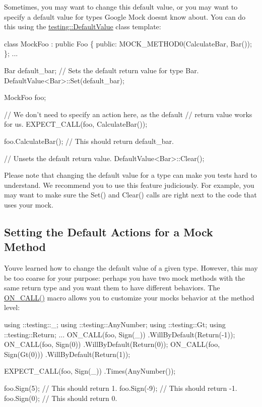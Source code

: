 Sometimes, you may want to change this default value, or you may want to specify a default value for types Google Mock doesn\textquotesingle{}t know about. You can do this using the {\ttfamily \hyperlink{classtesting_1_1DefaultValue}{testing\+::\+Default\+Value}} class template\+:


\begin{DoxyCode}
class MockFoo : public Foo \{
 public:
  MOCK\_METHOD0(CalculateBar, Bar());
\};
...

  Bar default\_bar;
  // Sets the default return value for type Bar.
  DefaultValue<Bar>::Set(default\_bar);

  MockFoo foo;

  // We don't need to specify an action here, as the default
  // return value works for us.
  EXPECT\_CALL(foo, CalculateBar());

  foo.CalculateBar();  // This should return default\_bar.

  // Unsets the default return value.
  DefaultValue<Bar>::Clear();
\end{DoxyCode}


Please note that changing the default value for a type can make you tests hard to understand. We recommend you to use this feature judiciously. For example, you may want to make sure the {\ttfamily Set()} and {\ttfamily Clear()} calls are right next to the code that uses your mock.

\subsection*{Setting the Default Actions for a Mock Method}

You\textquotesingle{}ve learned how to change the default value of a given type. However, this may be too coarse for your purpose\+: perhaps you have two mock methods with the same return type and you want them to have different behaviors. The {\ttfamily \hyperlink{gmock-spec-builders_8h_a5b12ae6cf84f0a544ca811b380c37334}{O\+N\+\_\+\+C\+A\+L\+L()}} macro allows you to customize your mock\textquotesingle{}s behavior at the method level\+:


\begin{DoxyCode}
using ::testing::\_;
using ::testing::AnyNumber;
using ::testing::Gt;
using ::testing::Return;
...
  ON\_CALL(foo, Sign(\_))
      .WillByDefault(Return(-1));
  ON\_CALL(foo, Sign(0))
      .WillByDefault(Return(0));
  ON\_CALL(foo, Sign(Gt(0)))
      .WillByDefault(Return(1));

  EXPECT\_CALL(foo, Sign(\_))
      .Times(AnyNumber());

  foo.Sign(5);   // This should return 1.
  foo.Sign(-9);  // This should return -1.
  foo.Sign(0);   // This should return 0.
\end{DoxyCode}



